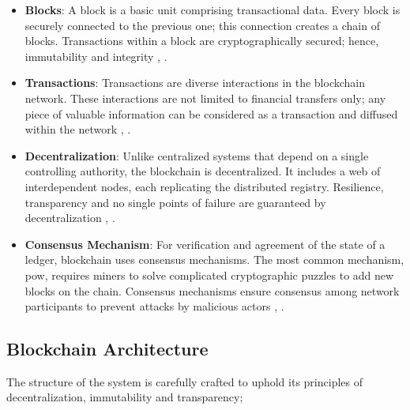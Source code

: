 \begin{itemize}
  \item \textbf{Blocks}: A block is a basic unit comprising transactional data. Every block is securely connected to the previous one; this connection creates a chain 
  of blocks. Transactions within a block are cryptographically secured; hence, immutability and integrity \cite{9596538}, \cite{ibm_blockchain}.
  \item \textbf{Transactions}: Transactions are diverse interactions in the blockchain network. These interactions are not limited to financial transfers only; any 
  piece of valuable information can be considered as a transaction and diffused within the network \cite{9752154}, \cite{9036241}.
  \item \textbf{Decentralization}: Unlike centralized systems that depend on a single controlling authority, the blockchain is decentralized. It includes a web of 
  interdependent nodes, each replicating the distributed registry. Resilience, transparency and no single points of failure are guaranteed by decentralization \cite{9596538}, \cite{9752154}.
  \item \textbf{Consensus Mechanism}:  For verification and agreement of the state of a ledger, blockchain uses consensus mechanisms. The most common mechanism, \gls{pow}, 
  requires miners to solve complicated cryptographic puzzles to add new blocks on the chain. Consensus mechanisms ensure consensus among network participants 
  to prevent attacks by malicious actors \cite{9596538}, \cite{9752154}.
\end{itemize}

\subsection{Blockchain Architecture}

The structure of the system is carefully crafted to uphold its principles of decentralization, immutability and transparency;

